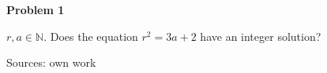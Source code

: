 \documentclass{article}
\begin{document}
{\bf Problem 1}

$r,a\in \mathbb{N}$. Does the equation $r^2=3a+2$ have an integer solution?


Sources: own work 
\end{document}
